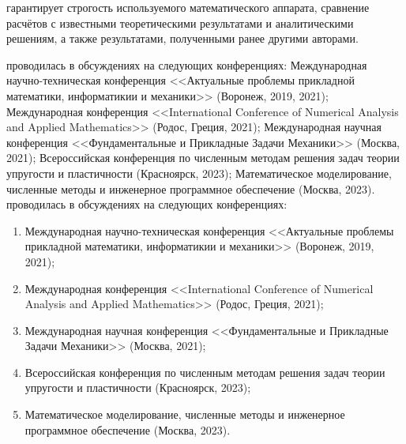 {\reliability} гарантирует строгость используемого математического аппарата, сравнение расчётов с известными теоретическими результатами и аналитическими решениям, а также результатами, полученными ранее другими авторами.

\ifsynopsis
{\probation} проводилась в обсуждениях на следующих конференциях:
Международная научно-техническая конференция <<Актуальные проблемы прикладной математики, информатикии и механики>> (Воронеж, 2019, 2021); Международная конференция <<International Conference of Numerical Analysis and Applied Mathematics>> (Родос, Греция, 2021); Международная научная конференция <<Фундаментальные и Прикладные Задачи Механики>> (Москва, 2021); Всероссийская конференция по численным методам решения задач теории упругости и пластичности (Красноярск, 2023); Математическое моделирование, численные методы и инженерное программное обеспечение (Москва, 2023).
\else
{\probation} проводилась в обсуждениях на следующих конференциях:
\begin{enumerate}
	\item Международная научно-техническая конференция <<Актуальные проблемы прикладной математики, информатикии и механики>> (Воронеж, 2019, 2021);
	\item Международная конференция <<International Conference of Numerical Analysis and Applied Mathematics>> (Родос, Греция, 2021);
	\item Международная научная конференция <<Фундаментальные и Прикладные Задачи Механики>> (Москва, 2021);
	\item Всероссийская конференция по численным методам решения задач теории упругости и пластичности (Красноярск, 2023);
	\item Математическое моделирование, численные методы и инженерное программное обеспечение (Москва, 2023).
\end{enumerate}
\fi

